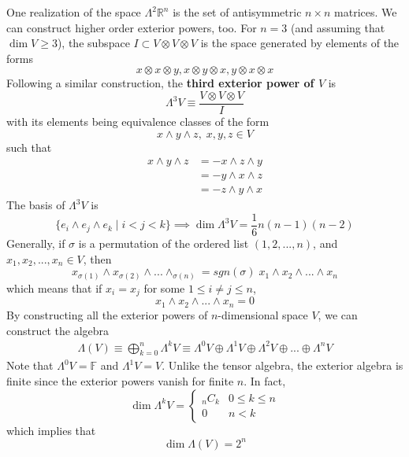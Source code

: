   One realization of the space $\Lambda^2 \mathbb{R}^n$ is the set of antisymmetric $n \times n$ matrices. We can construct higher order exterior powers, too. For $n = 3$ (and assuming that $\dim{V} \geq 3$), the subspace $I \subset V \otimes V \otimes V$ is the space generated by elements of the forms
  \[x \otimes x \otimes y, x \otimes y \otimes x, y \otimes x \otimes x\]
  Following a similar construction, the \textbf{third exterior power of $V$} is
  \[\Lambda^3 V \equiv \frac{V \otimes V \otimes V}{I}\]
  with its elements being equivalence classes of the form
  \[x \wedge y \wedge z,\; x, y, z \in V\]
  such that
  \begin{align*}
      x \wedge y \wedge z & = - x \wedge z \wedge y \\
      & = - y \wedge x \wedge z \\
      & = - z \wedge y \wedge x
  \end{align*}
  The basis of $\Lambda^3 V$ is
  \[\{e_i \wedge e_j \wedge e_k \; | \; i < j < k\} \implies \dim{\Lambda^3 V} = \frac{1}{6} n (n-1) (n-2)\]
  Generally, if $\sigma$ is a permutation of the ordered list $(1, 2, ..., n)$, and $x_1, x_2, ..., x_n \in V$, then 
  \[x_{\sigma(1)} \wedge x_{\sigma(2)} \wedge ... \wedge_{\sigma(n)} = sgn(\sigma) \; x_1 \wedge x_2 \wedge ... \wedge x_n\]
  which means that if $x_i = x_j$ for some $1 \leq i \neq j \leq n$, 
  \[x_1 \wedge x_2 \wedge ... \wedge x_n = 0\]
  By constructing all the exterior powers of $n$-dimensional space $V$, we can construct the algebra 
  \begin{align*}
      \Lambda(V) \equiv \bigoplus_{k=0}^n \Lambda^k V \equiv \Lambda^0 V \oplus \Lambda^1 V \oplus \Lambda^2 V \oplus ... \oplus \Lambda^n V 
  \end{align*}
  Note that $\Lambda^0 V = \mathbb{F}$ and $\Lambda^1 V = V$. Unlike the tensor algebra, the exterior algebra is finite since the exterior powers vanish for finite $n$. In fact, 
  \[ \dim{\Lambda^k V} = \begin{cases}
  _n C_k & 0 \leq k \leq n \\
  0 & n < k
  \end{cases}\]
  which implies that 
  \[\dim{\Lambda(V)} = 2^n \]
